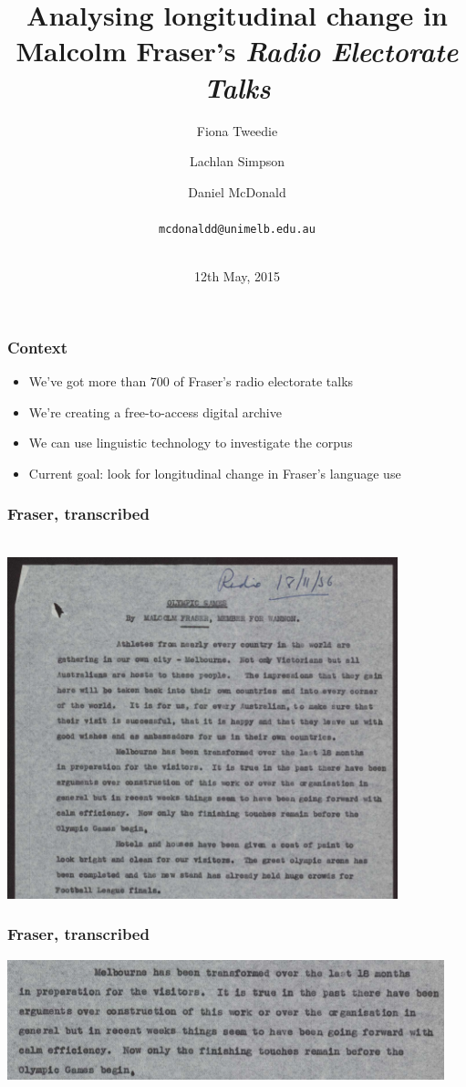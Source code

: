 \documentclass{beamer}       %
\title[\emph{ResPlat}, University of Melbourne]{Analysing longitudinal change in Malcolm Fraser's \emph{Radio Electorate Talks}}
\author[Tweedie, McDonald, Simpson]{Fiona Tweedie \and Lachlan Simpson \and Daniel McDonald\\~\\ \texttt{mcdonaldd@unimelb.edu.au}\\~\\}
\date{12th May, 2015}
\begin{document}


\frame{\titlepage}

\begin{frame}
	\frametitle{Context}
	\begin{itemize}
	\item We've got more than 700 of Fraser's radio electorate talks
	\item We're creating a free-to-access digital archive
	\item We can use linguistic technology to investigate the corpus
	\item Current goal: look for longitudinal change in Fraser's language use
	\end{itemize}
\end{frame}

\begin{frame}
    \frametitle{Fraser, transcribed}
    \centering ~ \\
    \includegraphics[width=0.85\textwidth]{images/mf-olympics}
\end{frame}

\begin{frame}
    \frametitle{Fraser, transcribed}
    \centering
    \includegraphics[width=0.95\textwidth]{images/mf-melbourne}
\end{frame}
\end{document}
